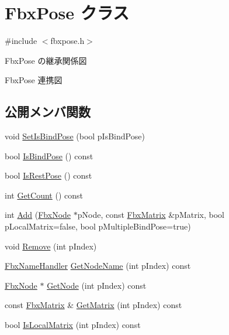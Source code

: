 \hypertarget{class_fbx_pose}{}\section{Fbx\+Pose クラス}
\label{class_fbx_pose}


{\ttfamily \#include $<$fbxpose.\+h$>$}



Fbx\+Pose の継承関係図


Fbx\+Pose 連携図
\subsection*{公開メンバ関数}
\begin{DoxyCompactItemize}
\item 
void \hyperlink{class_fbx_pose_ac7248f7018e656e1f95e1824d5f3b529}{Set\+Is\+Bind\+Pose} (bool p\+Is\+Bind\+Pose)
\item 
bool \hyperlink{class_fbx_pose_a6fa3e2bc1aafcdfd958923eb628d6ad5}{Is\+Bind\+Pose} () const
\item 
bool \hyperlink{class_fbx_pose_a4c5f2afbe45d2a5cf0725c3cdff90dcf}{Is\+Rest\+Pose} () const
\item 
int \hyperlink{class_fbx_pose_a748de4278ce7c09917571e00fcbef26b}{Get\+Count} () const
\item 
int \hyperlink{class_fbx_pose_a81218a5133b2490b4efdda6bf96bb2ae}{Add} (\hyperlink{class_fbx_node}{Fbx\+Node} $\ast$p\+Node, const \hyperlink{class_fbx_matrix}{Fbx\+Matrix} \&p\+Matrix, bool p\+Local\+Matrix=false, bool p\+Multiple\+Bind\+Pose=true)
\item 
void \hyperlink{class_fbx_pose_a8a2434897e944a957a699a19814d407f}{Remove} (int p\+Index)
\item 
\hyperlink{class_fbx_name_handler}{Fbx\+Name\+Handler} \hyperlink{class_fbx_pose_a9a6ce2c4c29248df156ca86bacdb905c}{Get\+Node\+Name} (int p\+Index) const
\item 
\hyperlink{class_fbx_node}{Fbx\+Node} $\ast$ \hyperlink{class_fbx_pose_a17056687b9315b92c04483ab298702bd}{Get\+Node} (int p\+Index) const
\item 
const \hyperlink{class_fbx_matrix}{Fbx\+Matrix} \& \hyperlink{class_fbx_pose_a40ef874ad005815e4def5900d438fdc4}{Get\+Matrix} (int p\+Index) const
\item 
bool \hyperlink{class_fbx_pose_a984ed3b9da9cc827ec15f910e79043c2}{Is\+Local\+Matrix} (int p\+Index) const
\end{DoxyCompactItemize}
